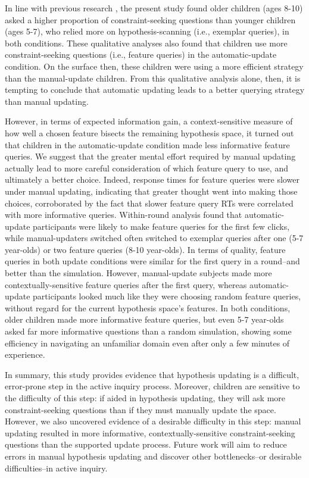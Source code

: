 \documentclass[man,floatsintext]{apa6}
\begin{document}
In line with previous research \cite{Mosher:1966,Ruggeri:2014}, the present study found older children (ages 8-10) asked a higher proportion of constraint-seeking questions than younger children (ages 5-7), who relied more on hypothesis-scanning (i.e., exemplar queries), in both conditions. These qualitative analyses also found that children use more constraint-seeking questions (i.e., feature queries) in the automatic-update condition. On the surface then, these children were using a more efficient strategy than the manual-update children. %
From this qualitative analysis alone, then, it is tempting to conclude that automatic updating leads to a better querying strategy than manual updating.

However, in terms of expected information gain, a context-sensitive measure of how well a chosen feature bisects the remaining hypothesis space, it turned out that children in the 
automatic-update condition made less informative feature queries. We 
suggest that the greater mental effort required by manual updating actually lead 
to more careful consideration of which feature query to use, and ultimately a better choice. Indeed, response times for feature queries were slower under manual updating, indicating that greater thought went into making those choices, corroborated by the fact that slower feature query RTs were correlated with more informative queries. Within-round analysis found that automatic-update participants were likely to make feature queries for the first few clicks, while manual-updaters switched often switched to exemplar queries after one (5-7 year-olds) or two feature queries (8-10 year-olds). In terms of quality, feature queries in both update conditions were similar for the first query in a round--and better than the simulation. However, manual-update subjects made more contextually-sensitive feature queries after the first query, whereas automatic-update participants looked much like they were choosing random feature queries, without regard for the current hypothesis space's features. In both conditions, older children made more informative feature queries, but even 5-7 year-olds asked far more informative questions than a random simulation, showing some efficiency in navigating an unfamiliar domain even after only a few minutes of experience. 

In summary, this study provides evidence that hypothesis updating is a difficult, error-prone step in the active inquiry process. Moreover, children are sensitive to the difficulty of this step: if aided in hypothesis updating, they will ask more constraint-seeking questions than if they must manually update the space. However, we also uncovered evidence of a desirable difficulty in this step: manual updating resulted in more informative, contextually-sensitive constraint-seeking questions than the supported update process. Future work will aim to reduce errors in manual hypothesis updating and discover other bottlenecks--or desirable difficulties--in active inquiry. 
\end{document}
